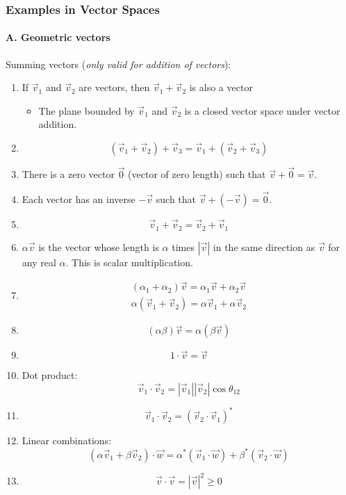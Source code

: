 \documentclass[a4paper,11pt,normalem]{article}
\begin{document}
\subsubsection{Examples in Vector Spaces}\label{examples-in-vector-spaces}

\paragraph{A. Geometric vectors}\label{a.-geometric-vectors}

Summing vectors (\emph{only valid for addition of vectors}):

\begin{enumerate}
\item
  If \(\vec{v}_1\) and \(\vec{v}_2\) are vectors, then
  \(\vec{v}_1 + \vec{v}_2\) is also a vector
  \begin{itemize}
  \item
    The plane bounded by \(\vec{v}_1\) and \(\vec{v}_2\) is a closed
    vector space under vector addition.
  \end{itemize}
\item
  \[(\vec{v}_1 + \vec{v}_2) + \vec{v}_3 = \vec{v}_1 + (\vec{v}_2 + \vec{v}_3)\]
\item
  There is a zero vector \(\vec{0}\) (vector of zero length) such that
  \(\vec{v} + \vec{0} = \vec{v}\).
\item
  Each vector has an inverse \(-\vec{v}\) such that
  \(\vec{v} + (-\vec{v}) = \vec{0}\).
\item
  \[\vec{v}_1 + \vec{v}_2 = \vec{v}_2 + \vec{v}_1\]
\item
  \(\alpha\vec{v}\) is the vector whose length is \(\alpha\) times
  \(|\vec{v}|\) in the same direction as \(\vec{v}\) for any real
  \(\alpha\). This is scalar multiplication.
\item
  \[\begin{aligned}(\alpha_1 + \alpha_2)\vec{v} = \alpha_1 \vec{v} + \alpha_2\vec{v} \\ \alpha(\vec{v}_1 + \vec{v}_2) = \alpha\vec{v}_1 + \alpha\vec{v}_2\end{aligned}\]
\item
  \[(\alpha\beta)\vec{v} = \alpha(\beta\vec{v})\]
\item
  \[1\cdot\vec{v} = \vec{v}\]
\item
  Dot product:
  \[\vec{v}_1 \cdot \vec{v}_2 = |\vec{v}_1||\vec{v}_2|\cos\theta_{12}\]
\item
  \[\vec{v}_1\cdot\vec{v}_2 = (\vec{v}_2\cdot\vec{v}_1)^* \]
\item
  Linear combinations:
  \[(\alpha\vec{v}_1 + \beta\vec{v}_2)\cdot\vec{w} = \alpha^{*}(\vec{v}_1\cdot\vec{w}) + \beta^{*}(\vec{v}_2\cdot\vec{w})\]
\item
  \[\vec{v}\cdot\vec{v} = |\vec{v}|^2 \geq 0\]
\end{enumerate}
\end{document}
